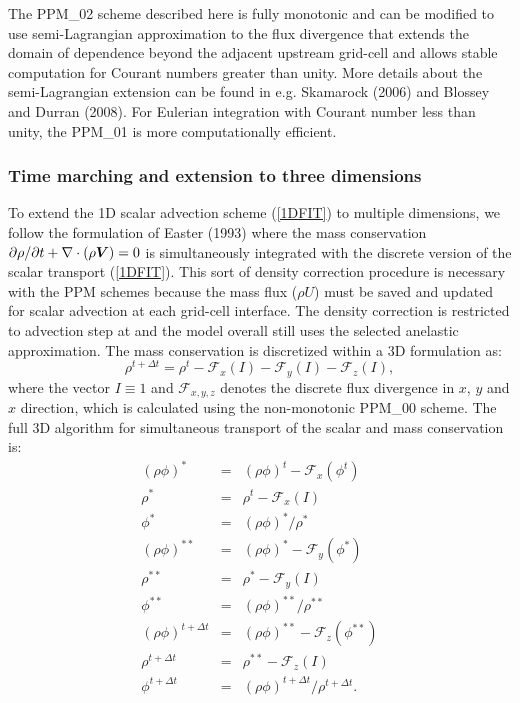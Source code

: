   The PPM\_{02} scheme described here is fully monotonic and can be
  modified to use semi-Lagrangian approximation to the flux divergence
  that extends the domain of dependence beyond the adjacent upstream
  grid-cell and allows stable computation for Courant numbers greater
  than unity. More details about the semi-Lagrangian extension can be
  found in e.g. Skamarock (2006) and Blossey and Durran (2008). For
  Eulerian integration with Courant number less than unity, the PPM\_01
  is more computationally efficient.

  \subsubsection{Time marching and extension to three dimensions}

  To extend the 1D scalar advection scheme (\ref{1DFIT}) to multiple
  dimensions, we follow the formulation of Easter (1993) where the mass
  conservation $\partial\rho/\partial t + \nabla \cdot (\rho \mbox{\boldmath$V$})=0$ is
  simultaneously integrated with the discrete version of the scalar
  transport (\ref{1DFIT}). This sort of density correction procedure is
  necessary with the PPM schemes because the mass flux ($\rho U$) must
  be saved and updated for scalar advection at each grid-cell
  interface. The density correction is restricted to advection step at
  and the model overall still uses the selected anelastic
  approximation. The mass conservation is discretized within a 3D
  formulation as:
  \begin{equation}
   \label{mass}
    \rho^{t+\Delta t} = \rho^{t} - \mathcal{F}_{x}(I) -
    \mathcal{F}_{y}(I) - \mathcal{F}_{z}(I),
  \end{equation}
  where the vector $I \equiv 1$ and $\mathcal{F}_{x,y,z}$ denotes the
  discrete flux divergence in $x$, $y$ and $x$ direction, which is
  calculated using the non-monotonic PPM\_00 scheme. The full 3D
  algorithm for simultaneous transport of the scalar and mass
  conservation is:
  \begin{eqnarray}
   \label{easter}
   (\rho\phi)^{*} &=& (\rho \phi)^{t} - \mathcal{F}_{x}(\phi^{t}) \\
   \nonumber
   \rho^{*} &=& \rho^{t} - \mathcal{F}_{x}(I) \\ \nonumber
   \phi^{*} &=& (\rho\phi)^{*} / \rho^{*} \\ \nonumber
   (\rho\phi)^{**} &=& (\rho \phi)^{*} - \mathcal{F}_{y}(\phi^{*}) \\
   \nonumber
   \rho^{**} &=& \rho^{*} - \mathcal{F}_{y}(I) \\ \nonumber
   \phi^{**} &=& (\rho\phi)^{**} / \rho^{**} \\ \nonumber
   (\rho\phi)^{t+\Delta t} &=& (\rho \phi)^{**} -
   \mathcal{F}_{z}(\phi^{**}) \\ \nonumber
   \rho^{t+\Delta t} &=& \rho^{**} - \mathcal{F}_{z}(I) \\ \nonumber
   \phi^{t+\Delta t} &=& (\rho\phi)^{t+\Delta t} / \rho^{t+\Delta t}.
  \end{eqnarray}
